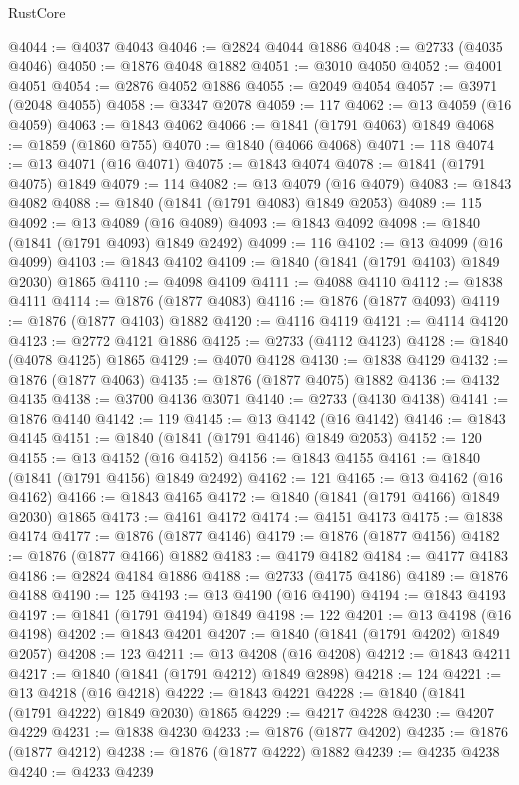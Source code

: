 \begin{lexlean}{RustCore}
\begin{coremodule}
@4044 := @4037 @4043
@4046 := @2824 @4044 @1886
@4048 := @2733 (@4035 @4046)
@4050 := @1876 @4048 @1882
@4051 := @3010 @4050
@4052 := @4001 @4051
@4054 := @2876 @4052 @1886
@4055 := @2049 @4054
@4057 := @3971 (@2048 @4055)
@4058 := @3347 @2078
@4059 := 117
@4062 := @13 @4059 (@16 @4059)
@4063 := @1843 @4062
@4066 := @1841 (@1791 @4063) @1849
@4068 := @1859 (@1860 @755)
@4070 := @1840 (@4066 @4068)
@4071 := 118
@4074 := @13 @4071 (@16 @4071)
@4075 := @1843 @4074
@4078 := @1841 (@1791 @4075) @1849
@4079 := 114
@4082 := @13 @4079 (@16 @4079)
@4083 := @1843 @4082
@4088 := @1840 (@1841 (@1791 @4083) @1849 @2053)
@4089 := 115
@4092 := @13 @4089 (@16 @4089)
@4093 := @1843 @4092
@4098 := @1840 (@1841 (@1791 @4093) @1849 @2492)
@4099 := 116
@4102 := @13 @4099 (@16 @4099)
@4103 := @1843 @4102
@4109 := @1840 (@1841 (@1791 @4103) @1849 @2030) @1865
@4110 := @4098 @4109
@4111 := @4088 @4110
@4112 := @1838 @4111
@4114 := @1876 (@1877 @4083)
@4116 := @1876 (@1877 @4093)
@4119 := @1876 (@1877 @4103) @1882
@4120 := @4116 @4119
@4121 := @4114 @4120
@4123 := @2772 @4121 @1886
@4125 := @2733 (@4112 @4123)
@4128 := @1840 (@4078 @4125) @1865
@4129 := @4070 @4128
@4130 := @1838 @4129
@4132 := @1876 (@1877 @4063)
@4135 := @1876 (@1877 @4075) @1882
@4136 := @4132 @4135
@4138 := @3700 @4136 @3071
@4140 := @2733 (@4130 @4138)
@4141 := @1876 @4140
@4142 := 119
@4145 := @13 @4142 (@16 @4142)
@4146 := @1843 @4145
@4151 := @1840 (@1841 (@1791 @4146) @1849 @2053)
@4152 := 120
@4155 := @13 @4152 (@16 @4152)
@4156 := @1843 @4155
@4161 := @1840 (@1841 (@1791 @4156) @1849 @2492)
@4162 := 121
@4165 := @13 @4162 (@16 @4162)
@4166 := @1843 @4165
@4172 := @1840 (@1841 (@1791 @4166) @1849 @2030) @1865
@4173 := @4161 @4172
@4174 := @4151 @4173
@4175 := @1838 @4174
@4177 := @1876 (@1877 @4146)
@4179 := @1876 (@1877 @4156)
@4182 := @1876 (@1877 @4166) @1882
@4183 := @4179 @4182
@4184 := @4177 @4183
@4186 := @2824 @4184 @1886
@4188 := @2733 (@4175 @4186)
@4189 := @1876 @4188
@4190 := 125
@4193 := @13 @4190 (@16 @4190)
@4194 := @1843 @4193
@4197 := @1841 (@1791 @4194) @1849
@4198 := 122
@4201 := @13 @4198 (@16 @4198)
@4202 := @1843 @4201
@4207 := @1840 (@1841 (@1791 @4202) @1849 @2057)
@4208 := 123
@4211 := @13 @4208 (@16 @4208)
@4212 := @1843 @4211
@4217 := @1840 (@1841 (@1791 @4212) @1849 @2898)
@4218 := 124
@4221 := @13 @4218 (@16 @4218)
@4222 := @1843 @4221
@4228 := @1840 (@1841 (@1791 @4222) @1849 @2030) @1865
@4229 := @4217 @4228
@4230 := @4207 @4229
@4231 := @1838 @4230
@4233 := @1876 (@1877 @4202)
@4235 := @1876 (@1877 @4212)
@4238 := @1876 (@1877 @4222) @1882
@4239 := @4235 @4238
@4240 := @4233 @4239

\end{coremodule}
\end{lexlean}

